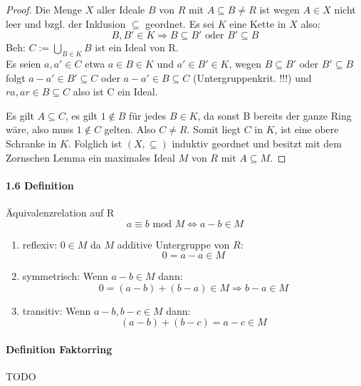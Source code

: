 \documentclass[a4paper]{article}
\begin{document}
\begin{proof}
      Die Menge $ X $ aller Ideale $ B $ von $ R $ mit $ A \subseteq B \neq R $ ist wegen $ A \in X $
      nicht leer und bzgl. der Inklusion $ \subseteq $ geordnet.
      Es sei $ K $ eine Kette in $ X $ also:
      $$ B, B' \in K \Rightarrow B \subseteq B' \text{ oder } B' \subseteq B $$ 
      Beh: $ C := \bigcup_{B \in K} B $ ist ein Ideal von R. \\
      Es seien $ a, a' \in C $ etwa $ a \in B \in K $ und $ a' \in B' \in K $, wegen 
      $ B \subseteq B' \text{ oder } B' \subseteq B $ folgt $ a - a' \in B' \subseteq C $
      oder $ a - a' \in B \subseteq C $  (Untergruppenkrit. !!!) und $ r a, a r \in B \subseteq C $ also ist C ein Ideal.

      Es gilt $ A \subseteq C $, es gilt $ 1 \notin B $ für jedes $ B \in K $, da sonst B bereits der ganze Ring wäre, also 
      muss $ 1 \notin C $ gelten. Also $ C \neq R $. Somit liegt $ C $ in $ K $, ist eine obere Schranke in $ K $.
      Folglich ist $ (X,\subseteq) $ induktiv geordnet und besitzt mit dem Zornschen Lemma ein maximales Ideal $ M $ von $ R $ mit $ A \subseteq M $.
\end{proof}

\paragraph{1.6 Definition} Äquivalenzrelation auf R  %
$$ a \equiv b \text{ mod } M \iff a - b \in M $$
\begin{enumerate}
      \item reflexiv: $ 0 \in M  $ da $ M $ additive Untergruppe von $ R $: 
      $$ 0 =  a - a \in M $$
     \item symmetrisch: Wenn $ a - b \in M $ dann:
      $$  0 = (a - b) + (b - a) \in M \Rightarrow b - a \in M $$
     \item transitiv: Wenn $ a - b, b - c \in M $ dann:
      $$ (a - b) + (b - c) = a - c \in M $$
\end{enumerate}

\paragraph{Definition Faktorring} TODO
\end{document}
